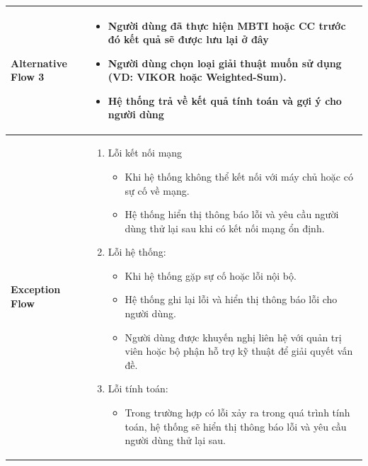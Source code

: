 \begin{longtable}[H]{|l|p{}|}
        \textbf{Alternative Flow 3} &  \vspace{-1cm} \begin{itemize}[leftmargin=4mm]
            \setlength\itemsep{0em}
            \item Người dùng đã thực hiện MBTI hoặc CC trước đó kết quả sẽ được lưu lại ở đây
            \item Người dùng chọn loại giải thuật muốn sử dụng (VD: VIKOR hoặc Weighted-Sum). 
            \item Hệ thống trả về kết quả tính toán và gợi ý cho người dùng
        \end{itemize} \\
        \hline
        \textbf{Exception Flow} &  \vspace{-1cm} \begin{enumerate}[leftmargin=5.5mm]
            \setlength\itemsep{0em}
            \item Lỗi kết nối mạng
                \begin{itemize}
                    \setlength\itemsep{0em}
                    \item Khi hệ thống không thể kết nối với máy chủ hoặc có sự cố về mạng.
                    \item Hệ thống hiển thị thông báo lỗi và yêu cầu người dùng thử lại sau khi có kết nối mạng ổn định.
                \end{itemize}
            \item Lỗi hệ thống:
                \begin{itemize}
                    \setlength\itemsep{0em}
                    \item Khi hệ thống gặp sự cố hoặc lỗi nội bộ.
                    \item Hệ thống ghi lại lỗi và hiển thị thông báo lỗi cho người dùng.
                    \item Người dùng được khuyến nghị liên hệ với quản trị viên hoặc bộ phận hỗ trợ kỹ thuật để giải quyết vấn đề.
                \end{itemize}
            \item Lỗi tính toán: 
                \begin{itemize}
                    \setlength\itemsep{0em}
                    \item Trong trường hợp có lỗi xảy ra trong quá trình tính toán, hệ thống sẽ hiển thị thông báo lỗi và yêu cầu người dùng thử lại sau.
                \end{itemize}
        \end{enumerate}\\
        \hline
    \end{longtable}


